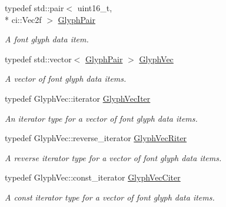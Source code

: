 \begin{DoxyCompactItemize}
\item 
\hypertarget{class_gui_text_aca27621ff95b564357e254f286050830}{typedef std\-::pair$<$ uint16\-\_\-t, \\*
ci\-::\-Vec2f $>$ \hyperlink{class_gui_text_aca27621ff95b564357e254f286050830}{Glyph\-Pair}}\label{class_gui_text_aca27621ff95b564357e254f286050830}

\begin{DoxyCompactList}\small\item\em A font glyph data item. \end{DoxyCompactList}\item 
\hypertarget{class_gui_text_add2a12dfdb7539d11f2df1961e0d48d8}{typedef std\-::vector$<$ \hyperlink{class_gui_text_aca27621ff95b564357e254f286050830}{Glyph\-Pair} $>$ \hyperlink{class_gui_text_add2a12dfdb7539d11f2df1961e0d48d8}{Glyph\-Vec}}\label{class_gui_text_add2a12dfdb7539d11f2df1961e0d48d8}

\begin{DoxyCompactList}\small\item\em A vector of font glyph data items. \end{DoxyCompactList}\item 
\hypertarget{class_gui_text_a054440052b7bdfce8730e2d886f6930a}{typedef Glyph\-Vec\-::iterator \hyperlink{class_gui_text_a054440052b7bdfce8730e2d886f6930a}{Glyph\-Vec\-Iter}}\label{class_gui_text_a054440052b7bdfce8730e2d886f6930a}

\begin{DoxyCompactList}\small\item\em An iterator type for a vector of font glyph data items. \end{DoxyCompactList}\item 
\hypertarget{class_gui_text_ab937be7c973011f0e263f8d603006767}{typedef Glyph\-Vec\-::reverse\-\_\-iterator \hyperlink{class_gui_text_ab937be7c973011f0e263f8d603006767}{Glyph\-Vec\-Riter}}\label{class_gui_text_ab937be7c973011f0e263f8d603006767}

\begin{DoxyCompactList}\small\item\em A reverse iterator type for a vector of font glyph data items. \end{DoxyCompactList}\item 
\hypertarget{class_gui_text_a29bb4d2e490498cc467836acd9f082d3}{typedef Glyph\-Vec\-::const\-\_\-iterator \hyperlink{class_gui_text_a29bb4d2e490498cc467836acd9f082d3}{Glyph\-Vec\-Citer}}\label{class_gui_text_a29bb4d2e490498cc467836acd9f082d3}

\begin{DoxyCompactList}\small\item\em A const iterator type for a vector of font glyph data items. \end{DoxyCompactList}\end{DoxyCompactItemize}
